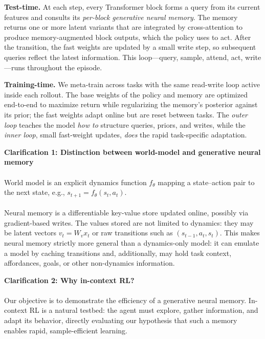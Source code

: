 \textbf{Test-time.}
At each step, every Transformer block forms a query from its current features and consults its \emph{per-block generative neural memory}. The memory returns one or more latent variants that are integrated by cross-attention to produce memory-augmented block outputs, which the policy uses to act. After the transition, the fast weights are updated by a small write step, so subsequent queries reflect the latest information. This loop---query, sample, attend, act, write---runs throughout the episode.

\textbf{Training-time.}
We meta-train across tasks with the same read-write loop active inside each rollout. The base weights of the policy and memory are optimized end-to-end to maximize return while regularizing the memory's posterior against its prior; the fast weights adapt online but are reset between tasks.
The \emph{outer loop} teaches the model \emph{how to} structure queries, priors, and writes, while the \emph{inner loop}, small fast-weight updates, \emph{does} the rapid task-specific adaptation.

\begin{tcolorbox}[clarifications]
\textbf{Clarification 1: Distinction between world-model and generative neural memory}
\\\\
World model is an explicit dynamics function \(f_{\theta}\) mapping a state–action pair to the next state, e.g., \(s_{t+1} = f_{\theta}(s_t, a_t)\).\\\\
Neural memory is a differentiable key-value store updated online, possibly via gradient-based writes. The values stored are not limited to dynamics: they may be latent vectors \(v_t = W_v x_t\) or raw transitions such as \((s_{t-1}, a_t, s_t)\). This makes neural memory strictly more general than a dynamics-only model: it can emulate a model by caching transitions and, additionally, may hold task context, affordances, goals, or other non-dynamics information.
\end{tcolorbox}

\begin{tcolorbox}[clarifications]
\textbf{Clarification 2: Why in-context RL?}
\\\\
Our objective is to demonstrate the efficiency of a generative neural memory. In-context RL is a natural testbed: the agent must explore, gather information, and adapt its behavior, directly evaluating our hypothesis that such a memory enables rapid, sample-efficient learning.
\end{tcolorbox}

